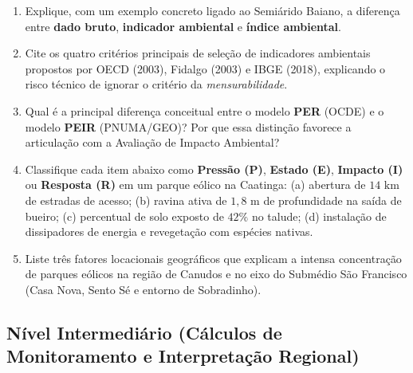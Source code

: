 \begin{enumerate}[leftmargin=1.8em, itemsep=6pt]
  \item Explique, com um exemplo concreto ligado ao Semiárido Baiano, a diferença entre \textbf{dado bruto}, \textbf{indicador ambiental} e \textbf{índice ambiental}.
  \espacoResolucao[1.8cm]

  \item Cite os quatro critérios principais de seleção de indicadores ambientais propostos por OECD (2003), Fidalgo (2003) e IBGE (2018), explicando o risco técnico de ignorar o critério da \textit{mensurabilidade}.
  \espacoResolucao[1.8cm]

  \item Qual é a principal diferença conceitual entre o modelo \textbf{PER} (OCDE) e o modelo \textbf{PEIR} (PNUMA/GEO)? Por que essa distinção favorece a articulação com a Avaliação de Impacto Ambiental?
  \espacoResolucao[1.8cm]

  \item Classifique cada item abaixo como \textbf{Pressão (P)}, \textbf{Estado (E)}, \textbf{Impacto (I)} ou \textbf{Resposta (R)} em um parque eólico na Caatinga: (a) abertura de $14\text{ km}$ de estradas de acesso; (b) ravina ativa de $1{,}8\text{ m}$ de profundidade na saída de bueiro; (c) percentual de solo exposto de $42\%$ no talude; (d) instalação de dissipadores de energia e revegetação com espécies nativas.
  \espacoResolucao[1.8cm]

  \item Liste três fatores locacionais geográficos que explicam a intensa concentração de parques eólicos na região de Canudos e no eixo do Submédio São Francisco (Casa Nova, Sento Sé e entorno de Sobradinho).
  \espacoResolucao[1.8cm]
\end{enumerate}

\subsection*{Nível Intermediário (Cálculos de Monitoramento e Interpretação Regional)}


